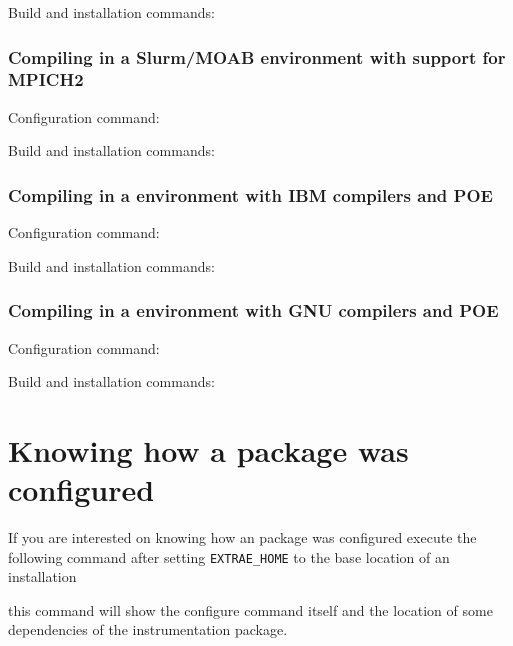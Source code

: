 Build and installation commands:


\subsubsection{Compiling in a Slurm/MOAB environment with support for MPICH2}

Configuration command:


Build and installation commands:


\subsubsection{Compiling in a environment with IBM compilers and POE}

Configuration command:


Build and installation commands:


\subsubsection{Compiling in a environment with GNU compilers and POE}

Configuration command:


Build and installation commands:


\section{Knowing how a package was configured}

If you are interested on knowing how an \TRACE package was configured execute the following command after setting {\tt EXTRAE\_HOME} to the base location of an installation


this command will show the configure command itself and the location of some dependencies of the instrumentation package.
